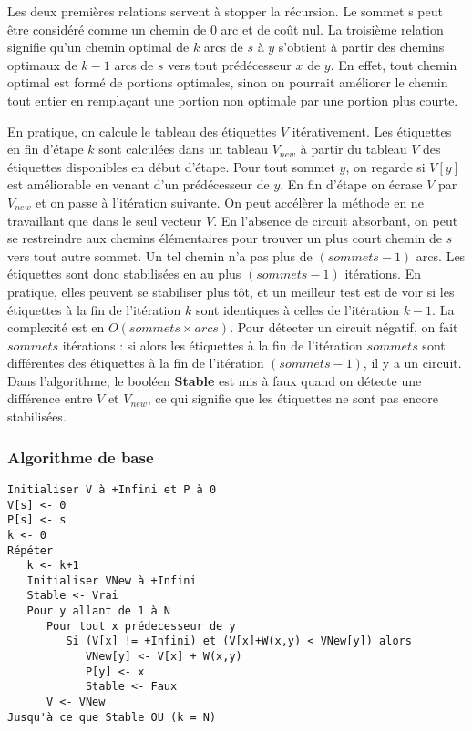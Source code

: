 \documentclass{article}
\begin{document}
Les deux premières relations servent à stopper la récursion. Le sommet s peut être considéré comme un chemin de 0 arc et de coût nul. La troisième relation signifie qu’un chemin 
optimal de $k$ arcs de $s$ à $y$ s’obtient à partir des chemins optimaux de $k-1$ arcs de $s$ vers tout prédécesseur $x$ de $y$. En effet, tout chemin optimal est formé de 
portions optimales, sinon on pourrait améliorer le chemin tout entier en remplaçant une portion non optimale par une portion plus courte.

En pratique, on calcule le tableau des étiquettes $V$ itérativement. Les étiquettes en fin d’étape $k$ sont calculées dans un tableau $V_{new}$ à partir du tableau $V$ des 
étiquettes disponibles en début d’étape. Pour tout sommet $y$, on regarde si $V[y]$ est améliorable en venant d’un prédécesseur de $y$. En fin d’étape on écrase $V$ par 
$V_{new}$ et on passe à l’itération suivante. On peut accélèrer la méthode en ne travaillant que dans le seul vecteur $V$. En l’absence de circuit absorbant, on peut se restreindre 
aux chemins élémentaires pour trouver un plus court chemin de $s$ vers tout autre sommet. Un tel chemin n’a pas plus de $(sommets-1)$ arcs. Les étiquettes sont donc stabilisées 
en au plus $(sommets-1)$ itérations. En pratique, elles peuvent se stabiliser plus tôt, et un meilleur test est de voir si les étiquettes à la fin de l’itération $k$ sont identiques à 
celles de l’itération $k-1$. La complexité est en $O(sommets \times arcs)$.
\newpage
Pour détecter un circuit négatif, on fait $sommets$ itérations : si alors les étiquettes à la fin de l’itération $sommets$ sont différentes des étiquettes à la fin de l’itération 
$(sommets-1)$, il y a un circuit. Dans l’algorithme, le booléen \textbf{Stable} est mis à faux quand on détecte une différence entre $V$ et $V_{new}$, ce qui signifie que les 
étiquettes ne sont pas encore stabilisées.

\subsubsection{Algorithme de base}

\begin{verbatim}
Initialiser V à +Infini et P à 0
V[s] <- 0
P[s] <- s
k <- 0
Répéter
   k <- k+1
   Initialiser VNew à +Infini
   Stable <- Vrai
   Pour y allant de 1 à N
      Pour tout x prédecesseur de y
         Si (V[x] != +Infini) et (V[x]+W(x,y) < VNew[y]) alors
            VNew[y] <- V[x] + W(x,y)
            P[y] <- x
            Stable <- Faux
      V <- VNew
Jusqu'à ce que Stable OU (k = N)
\end{verbatim}
\end{document}
